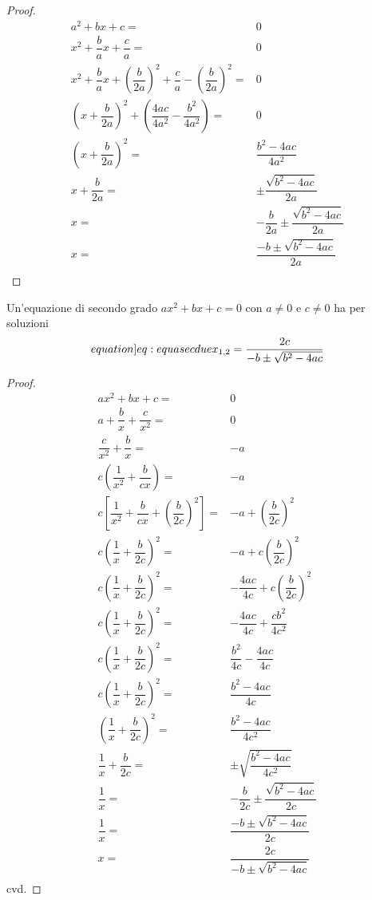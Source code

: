 \begin{proof}
\begin{align*}
	a^2+bx+c=&0\\
	x^2+\dfrac{b}{a}x+\dfrac{c}{a}=&0\\
	x^2+\dfrac{b}{a}x+\left(\dfrac{b}{2a}\right)^2+\dfrac{c}{a}-\left(\dfrac{b}{2a}\right)^2=&0\\
	\left(x+\dfrac{b}{2a}\right)^2+\left(\dfrac{4ac}{4a^2}-\dfrac{b^2}{4a^2}\right)=&0\\
	\left(x+\dfrac{b}{2a}\right)^2=&\dfrac{b^2-4ac}{4a^2}\\
	x+\dfrac{b}{2a}=&\pm\dfrac{\sqrt{b^2-4ac}}{2a}\\
	x=&-\dfrac{b}{2a}\pm\dfrac{\sqrt{b^2-4ac}}{2a}\\
	x=&\dfrac{-b\pm\sqrt{b^2-4ac}}{2a}\\
\end{align*}
\end{proof}
\begin{thm}\label{thm:Equasecdue}
	Un'equazione di secondo grado $ax^2+bx+c=0$ con $a\neq 0$ e $c\neq 0$ ha 
	per soluzioni \begin{equation*}\label[equation]{eq:equasecdue}
		x_{1,2}=\dfrac{2c}{-b\pm\sqrt{b^2-4ac}}
	\end{equation*}
\end{thm}\cite{Wilson2022}
\begin{proof}
	\begin{align*}
		ax^2+bx+c=&0\\
		a+\dfrac{b}{x}+\dfrac{c}{x^2}=&0\\
		\dfrac{c}{x^2}+\dfrac{b}{x}=&-a\\
		c\left(\dfrac{1}{x^2}+\dfrac{b}{cx}\right)=&-a\\
		c\left[\dfrac{1}{x^2}+\dfrac{b}{cx}+\left(\dfrac{b}{2c}\right)^2\right]=&-a+\left(\dfrac{b}{2c}\right)^2\\
		c\left(\dfrac{1}{x}+\dfrac{b}{2c}\right)^2=&-a+c\left(\dfrac{b}{2c}\right)^2\\
		c\left(\dfrac{1}{x}+\dfrac{b}{2c}\right)^2=&-\dfrac{4ac}{4c}+c\left(\dfrac{b}{2c}\right)^2\\
		c\left(\dfrac{1}{x}+\dfrac{b}{2c}\right)^2=&-\dfrac{4ac}{4c}+\dfrac{cb^2}{4c^2}\\
		c\left(\dfrac{1}{x}+\dfrac{b}{2c}\right)^2=&\dfrac{b^2}{4c}-\dfrac{4ac}{4c}\\
		c\left(\dfrac{1}{x}+\dfrac{b}{2c}\right)^2=&\dfrac{b^2-4ac}{4c}\\
		\left(\dfrac{1}{x}+\dfrac{b}{2c}\right)^2=&\dfrac{b^2-4ac}{4c^2}\\
		\dfrac{1}{x}+\dfrac{b}{2c}=&\pm\sqrt{\dfrac{b^2-4ac}{4c^2}}\\
		\dfrac{1}{x}=&-\dfrac{b}{2c}\pm\dfrac{\sqrt{b^2-4ac}}{2c}\\
		\dfrac{1}{x}=&\dfrac{-b\pm\sqrt{b^2-4ac}}{2c}\\
		x=&\dfrac{2c}{-b\pm\sqrt{b^2-4ac}}\\
	\end{align*}
cvd.
\end{proof}
